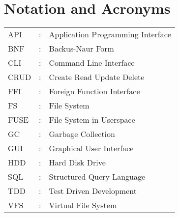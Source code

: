 \chapter*{Notation and Acronyms}
\vspace{1cm}

\noindent
\begin{tabular}{lcl}
    API &: & Application Programming Interface \\
    BNF &: & Backus-Naur Form \\
    CLI &: & Command Line Interface \\
    CRUD &: & Create Read Update Delete \\
    FFI &: & Foreign Function Interface \\
    FS &: & File System \\
    FUSE &: & File System in Userspace \\
    GC &: & Garbage Collection \\
    GUI &: & Graphical User Interface \\
    HDD &: & Hard Disk Drive \\
    SQL &: & Structured Query Language \\
    TDD &: & Test Driven Development \\
    VFS &: & Virtual File System \\
\end{tabular}
